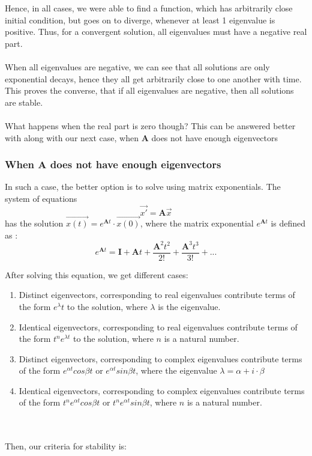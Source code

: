 \documentclass{article}
\begin{document}
Hence, in all cases, we were able to find a function, which has arbitrarily close initial condition, but goes on to diverge, whenever at least 1 eigenvalue is positive. Thus, for a convergent solution, all eigenvalues must have a negative real part. 
\\
\\
When all eigenvalues are negative, we can see that all solutions are only exponential decays, hence they all get arbitrarily close to one another with time. This proves the converse, that if all eigenvalues are negative, then all solutions are stable.
\\
\\
What happens when the real part is zero though? This can be answered better with along with our next case, when $\boldsymbol{A}$ does not have enough eigenvectors

\subsubsection{When $\boldsymbol{A}$ does not have enough eigenvectors}

In such a case, the better option is to solve using matrix exponentials. The system of equations
$$\overrightarrow{x'} = \boldsymbol{A} \overrightarrow{x}$$
has the solution $\overrightarrow{x(t)} = e^{\boldsymbol{A} t} \cdot \overrightarrow{x(0)}$, where the matrix exponential $e^{\boldsymbol{A} t}$ is defined as :
$$e^{\boldsymbol{A} t} = \boldsymbol{I} + \boldsymbol{A}t + \frac{\boldsymbol{A}^2 t^2}{2!} + \frac{\boldsymbol{A}^3 t^3}{3!} + ...$$

After solving this equation, we get different cases:
\begin{enumerate}
    \item Distinct eigenvectors, corresponding to real eigenvalues contribute terms of the form $e^\lambda t$ to the solution, where $\lambda$ is the eigenvalue.
    \item Identical eigenvectors, corresponding to real eigenvalues contribute terms of the form $t^n e^{\lambda t}$ to the solution, where $n$ is a natural number.
    \item Distinct eigenvectors, corresponding to complex eigenvalues contribute terms of the form $e^{\alpha t} cos{\beta t}$ or $e^{\alpha t} sin {\beta t}$, where the eigenvalue $\lambda = \alpha + i \cdot \beta$
    \item Identical eigenvectors, corresponding to complex eigenvalues contribute terms of the form $t^n e^{\alpha t} cos{\beta t}$ or $t^n e^{\alpha t} sin{\beta t}$, where $n$ is a natural number.
\end{enumerate}
\\
\\
Then, our criteria for stability is:
\end{document}
